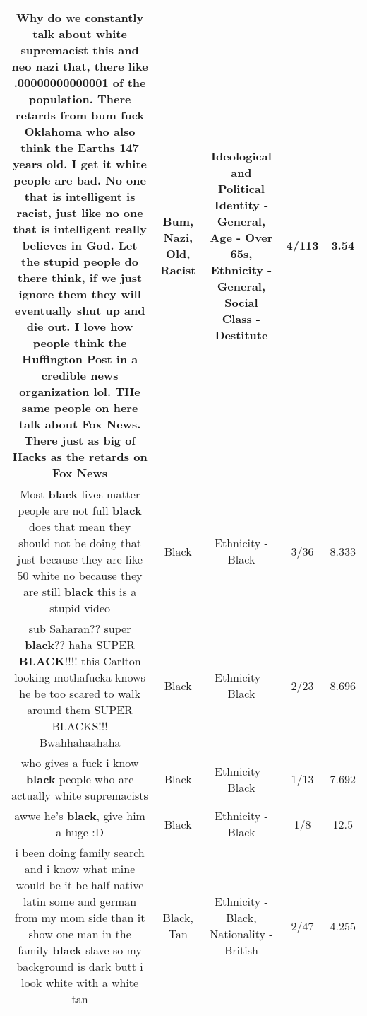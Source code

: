 \documentclass[11pt]{article}
\newlength\mylength
\begin{document}
\begin{center}
\begin{longtable}{|C{.65\mylength}|C{.30\mylength}|C{.12\mylength}|C{.12\mylength}|C{.12\mylength}|}
  \small Why do we constantly talk about white supremacist this and neo \textbf{nazi} that, there like .00000000000001 of the population. There retards from \textbf{bum} fuck Oklahoma who also think the Earths 147 years \textbf{old}. I get it white people are bad. No one that is intelligent is \textbf{racist}, just like no one that is intelligent really believes in God. Let the stupid people do there think, if we just ignore them they will eventually shut up and die out.  I love how people think the Huffington Post in a credible news organization lol. THe same people on here talk about Fox News. There just as big of Hacks as the retards on Fox News\normalsize   & Bum, Nazi, Old, Racist &  Ideological and Political Identity - General, Age - Over 65s, Ethnicity - General, Social Class - Destitute & 4/113 & 3.54 \\  \hline
  \small Most \textbf{black} lives matter people are not full \textbf{black} does that mean they should not be doing that just because they are like 50 white no because they are still \textbf{black} this is a stupid video\normalsize   & Black & Ethnicity - Black & 3/36 & 8.333 \\  \hline
  \small sub Saharan?? super \textbf{black}?? haha SUPER \textbf{BLACK}!!!! this Carlton looking mothafucka knows he be too  scared to walk around them SUPER BLACKS!!! Bwahhahaahaha\normalsize   & Black & Ethnicity - Black & 2/23 & 8.696 \\  \hline
  \small who gives a fuck i know \textbf{black} people who are actually white supremacists\normalsize   & Black & Ethnicity - Black & 1/13 & 7.692 \\  \hline
  \small awwe he's \textbf{black}, give him a huge :D\normalsize   & Black & Ethnicity - Black & 1/8 & 12.5 \\  \hline
  \small i been doing family search and i know what mine would be it be half native latin  some and german from my mom side than it show one man in the family \textbf{black} slave so my background is dark butt i look white with a white tan\normalsize   & Black, Tan & Ethnicity - Black, Nationality - British & 2/47 & 4.255 \\  \hline

\end{longtable}
\end{center}
\end{document}
